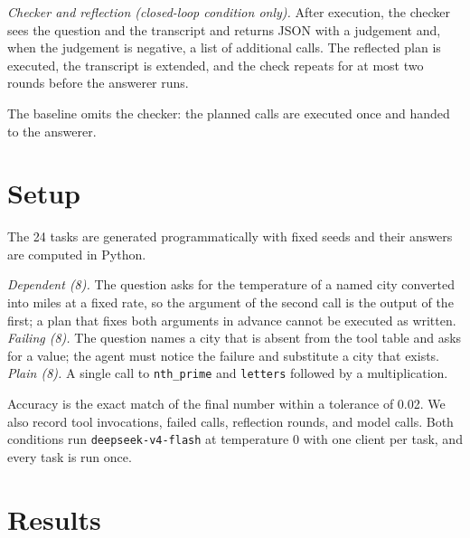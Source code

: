 \documentclass[runningheads,a4paper]{llncs}
\begin{document}
\emph{Checker and reflection (closed-loop condition only).} After execution, the checker sees the question and the transcript and returns JSON with a judgement and, when the judgement is negative, a list of additional calls. The reflected plan is executed, the transcript is extended, and the check repeats for at most two rounds before the answerer runs.

The baseline omits the checker: the planned calls are executed once and handed to the answerer.

\section{Setup}

The 24 tasks are generated programmatically with fixed seeds and their answers are computed in Python.

\emph{Dependent (8).} The question asks for the temperature of a named city converted into miles at a fixed rate, so the argument of the second call is the output of the first; a plan that fixes both arguments in advance cannot be executed as written. \emph{Failing (8).} The question names a city that is absent from the tool table and asks for a value; the agent must notice the failure and substitute a city that exists. \emph{Plain (8).} A single call to \texttt{nth\_\allowbreak{}prime} and \texttt{letters} followed by a multiplication.

Accuracy is the exact match of the final number within a tolerance of 0.02. We also record tool invocations, failed calls, reflection rounds, and model calls. Both conditions run \texttt{deepseek\allowbreak{}-v4-flas\allowbreak{}h} at temperature 0 with one client per task, and every task is run once.

\section{Results}
\end{document}
